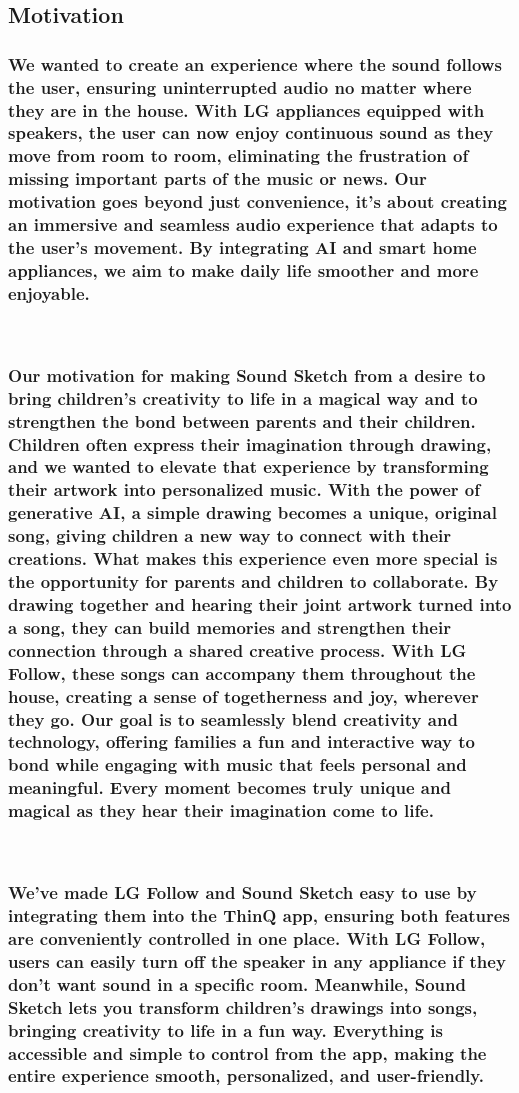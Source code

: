 \documentclass[conference]{IEEEtran}
\begin{document}
\subsection{Motivation}

\subsubsection{We wanted to create an experience where the sound follows the user, ensuring uninterrupted audio no matter where they are in the house. With LG appliances equipped with speakers, the user can now enjoy continuous sound as they move from room to room, eliminating the frustration of missing important parts of the music or news.
Our motivation goes beyond just convenience, it’s about creating an immersive and seamless audio experience that adapts to the user's movement. By integrating AI and smart home appliances, we aim to make daily life smoother and more enjoyable.}
\

\subsubsection{Our motivation for making Sound Sketch from a desire to bring children's creativity to life in a magical way and to strengthen the bond between parents and their children. Children often express their imagination through drawing, and we wanted to elevate that experience by transforming their artwork into personalized music. With the power of generative AI, a simple drawing becomes a unique, original song, giving children a new way to connect with their creations.
What makes this experience even more special is the opportunity for parents and children to collaborate. By drawing together and hearing their joint artwork turned into a song, they can build memories and strengthen their connection through a shared creative process. With LG Follow, these songs can accompany them throughout the house, creating a sense of togetherness and joy, wherever they go.
Our goal is to seamlessly blend creativity and technology, offering families a fun and interactive way to bond while engaging with music that feels personal and meaningful. Every moment becomes truly unique and magical as they hear their imagination come to life.}


\
\subsubsection{We’ve made LG Follow and Sound Sketch easy to use by integrating them into the ThinQ app, ensuring both features are conveniently controlled in one place. With LG Follow, users can easily turn off the speaker in any appliance if they don’t want sound in a specific room. Meanwhile, Sound Sketch lets you transform children's drawings into songs, bringing creativity to life in a fun way. Everything is accessible and simple to control from the app, making the entire experience smooth, personalized, and user-friendly.}
\end{document}

